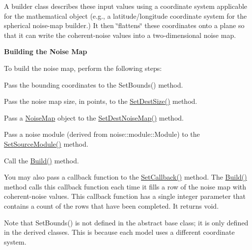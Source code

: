 A builder class describes these input values using a coordinate system applicable for the mathematical object (e.\+g., a latitude/longitude coordinate system for the spherical noise-\/map builder.) It then \char`\"{}flattens\char`\"{} these coordinates onto a plane so that it can write the coherent-\/noise values into a two-\/dimensional noise map.

{\bfseries Building the Noise Map}

To build the noise map, perform the following steps\+:
\begin{DoxyItemize}
\item Pass the bounding coordinates to the Set\+Bounds() method.
\item Pass the noise map size, in points, to the \hyperlink{classnoise_1_1utils_1_1_noise_map_builder_abad282f0cbe67824b73c580f611a7bd0}{Set\+Dest\+Size()} method.
\item Pass a \hyperlink{classnoise_1_1utils_1_1_noise_map}{Noise\+Map} object to the \hyperlink{classnoise_1_1utils_1_1_noise_map_builder_a07555b64324efbb16f0ef244c4fed8b7}{Set\+Dest\+Noise\+Map()} method.
\item Pass a noise module (derived from noise\+::module\+::\+Module) to the \hyperlink{classnoise_1_1utils_1_1_noise_map_builder_aa39e8ea292711aa3a7627ddcaee4f12f}{Set\+Source\+Module()} method.
\item Call the \hyperlink{classnoise_1_1utils_1_1_noise_map_builder_abe0e5f01c696c2290792c8f8736e3ed1}{Build()} method.
\end{DoxyItemize}

You may also pass a callback function to the \hyperlink{classnoise_1_1utils_1_1_noise_map_builder_ac760187423eb5e16ac015f9beafd78ea}{Set\+Callback()} method. The \hyperlink{classnoise_1_1utils_1_1_noise_map_builder_abe0e5f01c696c2290792c8f8736e3ed1}{Build()} method calls this callback function each time it fills a row of the noise map with coherent-\/noise values. This callback function has a single integer parameter that contains a count of the rows that have been completed. It returns void.

Note that Set\+Bounds() is not defined in the abstract base class; it is only defined in the derived classes. This is because each model uses a different coordinate system. 

